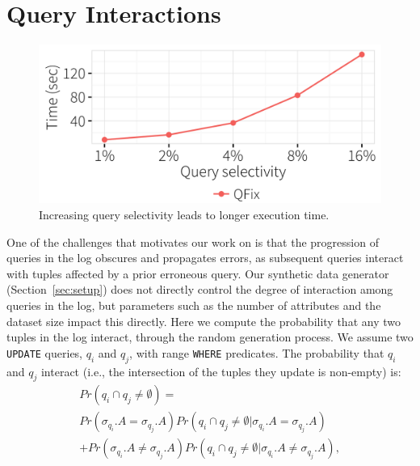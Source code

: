 \section{Query Interactions} \label{app:selectivity}

\begin{figure}[t]
\centering
  \includegraphics[width =.66\columnwidth]{figures/rangevstime}
  \vspace{-2mm}
 \caption{ Increasing query selectivity leads to longer \sys execution time.}
  \label{f:selectivityvstime} 
\end{figure}

One of the challenges that motivates our work on \sys is that the progression
of queries in the log obscures and propagates errors, as subsequent queries
interact with tuples affected by a prior erroneous query. Our synthetic data
generator (Section~\ref{sec:setup}) does not directly control the degree of
interaction among queries in the log, but parameters such as the number of
attributes and the dataset size impact this directly. Here we compute the
probability that any two tuples in the log interact, through the random
generation process. We assume two \texttt{UPDATE} queries, $q_i$ and $q_j$,
with range \texttt{WHERE} predicates.  The probability that $q_i$ and $q_j$ interact (i.e., the intersection of the tuples they update is non-empty) is:
\begin{multline*}
Pr(q_i\cap q_j \neq \emptyset) =\\ 
Pr(\sigma_{q_i}.A= \sigma_{q_j}.A)Pr(q_i\cap q_j \neq \emptyset |\sigma_{q_i}.A= \sigma_{q_j}.A) \\
+ Pr(\sigma_{q_i}.A\neq \sigma_{q_j}.A)Pr(q_i\cap q_j \neq \emptyset |\sigma_{q_i}.A\neq \sigma_{q_j}.A), 
\end{multline*}



